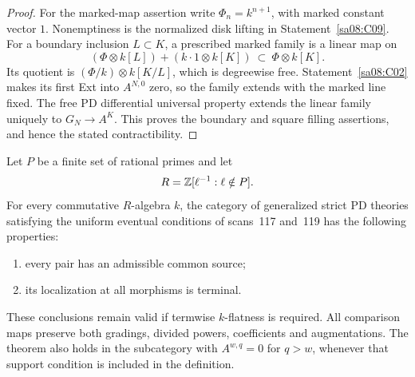 \begin{proof}
For the marked-map assertion write $\Phi_n=k^{n+1}$, with marked
constant vector $1$. Nonemptiness is the normalized disk lifting
in Statement~\ref{sa08:C09}. For a boundary inclusion $L\subset K$,
a prescribed marked family is a linear map on
\[
 (\Phi\otimes k[L])+(k\cdot1\otimes k[K])
 \ \subset\ \Phi\otimes k[K].
\]
Its quotient is $(\Phi/k)\otimes k[K/L]$, which is degreewise free.
Statement~\ref{sa08:C02} makes its first Ext into $A^{N,0}$ zero,
so the family extends with the marked line fixed. The free PD
differential universal property extends the linear family uniquely
to $G_N\to A^K$. This proves the boundary and square filling
assertions, and hence the stated contractibility.
\end{proof}

\begin{theorem}\label{sa08:C17}
Let $P$ be a finite set of rational primes and let
\[
 R=\mathbb Z[\ell^{-1}:\ell\notin P].
\]
For every commutative $R$-algebra $k$, the category of generalized
strict PD theories satisfying the uniform eventual conditions of
scans~117 and~119 has the following properties:
\begin{enumerate}
\item every pair has an admissible common source;
\item its localization at all morphisms is terminal.
\end{enumerate}
These conclusions remain valid if termwise $k$-flatness is required.
All comparison maps preserve both gradings, divided powers,
coefficients and augmentations. The theorem also holds in the
subcategory with $A^{w,q}=0$ for $q>w$, whenever that support
condition is included in the definition.
\end{theorem}
